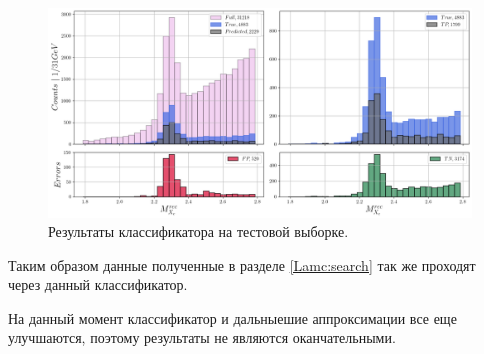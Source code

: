\begin{figure}[H]
    \centering
    \includegraphics[width=1\linewidth]{img/MC_res.png}
    \caption{Результаты классификатора на тестовой выборке.}
    \label{hist}
\end{figure}

Таким образом данные полученные в разделе \ref{Lamc:search} так же проходят через данный классификатор.

На данный момент классификатор и дальныешие аппроксимации все еще улучшаются, 
поэтому результаты не являются оканчательными.
